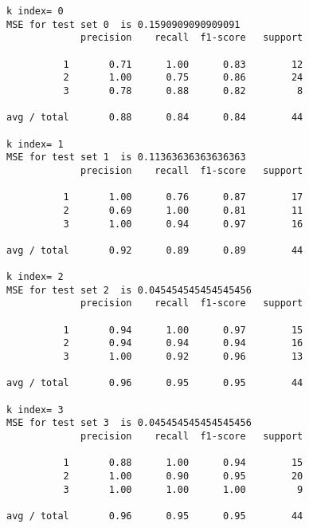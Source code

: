 \documentclass[11pt]{article}
\begin{document}
    \begin{Verbatim}[commandchars=\\\{\}]
k index= 0
MSE for test set 0  is 0.1590909090909091
             precision    recall  f1-score   support

          1       0.71      1.00      0.83        12
          2       1.00      0.75      0.86        24
          3       0.78      0.88      0.82         8

avg / total       0.88      0.84      0.84        44

k index= 1
MSE for test set 1  is 0.11363636363636363
             precision    recall  f1-score   support

          1       1.00      0.76      0.87        17
          2       0.69      1.00      0.81        11
          3       1.00      0.94      0.97        16

avg / total       0.92      0.89      0.89        44

k index= 2
MSE for test set 2  is 0.045454545454545456
             precision    recall  f1-score   support

          1       0.94      1.00      0.97        15
          2       0.94      0.94      0.94        16
          3       1.00      0.92      0.96        13

avg / total       0.96      0.95      0.95        44

k index= 3
MSE for test set 3  is 0.045454545454545456
             precision    recall  f1-score   support

          1       0.88      1.00      0.94        15
          2       1.00      0.90      0.95        20
          3       1.00      1.00      1.00         9

avg / total       0.96      0.95      0.95        44


    \end{Verbatim}
\end{document}
